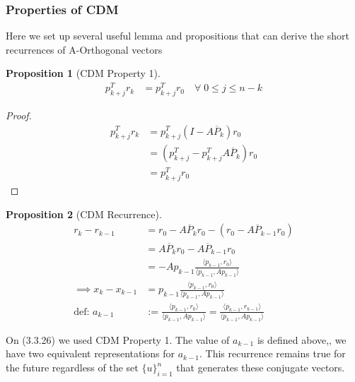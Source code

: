 \documentclass[]{article}
\theoremstyle{definition}
\newtheorem{prop}{Proposition}[section]  %
\begin{document}
        \subsubsection{Properties of CDM}
            Here we set up several useful lemma and propositions that can derive the short recurrences of A-Orthogonal vectors 
            \begin{prop}[CDM Property 1]
                \begin{align}
                    p_{k + j}^Tr_k &= p_{k + j}^Tr_0 \quad \forall \; 0 \le j \le n - k
                \end{align}
            \end{prop}
            \begin{proof}
                \begin{align}
                    p_{k + j}^Tr_k &= p_{k + j}^T(I - A\overline{P}_k)r_0
                    \\
                    &= (p^T_{k + j} - p^T_{k + j}A\overline{P}_k)r_0
                    \\
                    &= p_{k + j}^Tr_0    
                \end{align}
            \end{proof}
            \begin{prop}[CDM Recurrence]\label{prop:CDM_Recurrence}
                \begin{align}
                    r_k - r_{k - 1} &= r_0 - A\overline{P}_kr_0 - (r_0 - A\overline{P}_{k - 1}r_0)
                    \\
                    &= A\overline{P}_kr_0 - A\overline{P}_{k - 1}r_0
                    \\
                    &= - Ap_{k - 1}\frac{\langle p_{k - 1}, r_0\rangle}{\langle p_{k - 1}, Ap_{k - 1}\rangle}
                    \\
                    \implies 
                    x_{k} - x_{k - 1} &= 
                    p_{k - 1}\frac{\langle p_{k - 1}, r_0\rangle}{\langle p_{k - 1}, Ap_{k - 1}\rangle}
                    \\
                    \text{def: } a_{k - 1} &:= \frac{\langle p_{k - 1}, r_0\rangle}{
                        \langle p_{k - 1}, Ap_{k - 1}\rangle
                    } = 
                    \frac{\langle p_{k - 1}, r_{k - 1}\rangle}{
                        \langle p_{k - 1}, Ap_{k - 1}\rangle
                    }
            \end{align}
            \end{prop}
            On (3.3.26) we used CDM Property 1. The value of $a_{k - 1}$ is defined above,, we have two equivalent representations for $a_{k - 1}$. This recurrence remains true for the future regardless of the set $\{u\}_{i = 1}^{n}$ that generates these conjugate vectors. 
\end{document}
